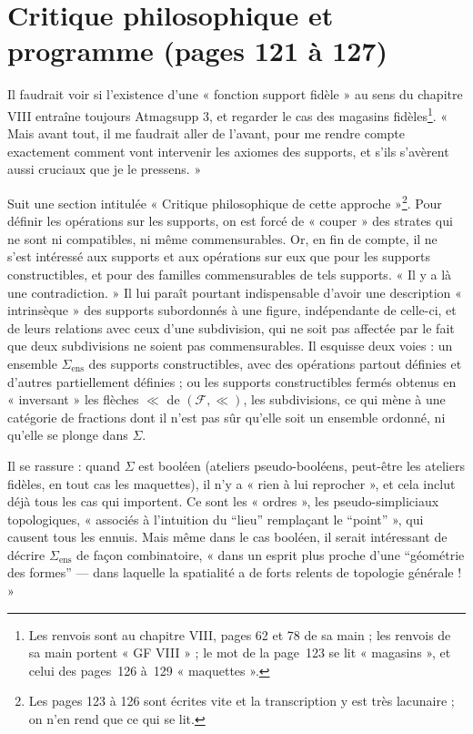 \documentclass[11pt,a4paper]{article}
\begin{document}
\section*{Critique philosophique et programme (pages 121 à 127)}

Il faudrait voir si l'existence d'une « fonction support fidèle » au sens du
chapitre VIII entraîne toujours Atmagsupp 3, et regarder le cas des magasins fidèles\footnote{Les renvois sont au chapitre VIII, pages 62 et
78 de sa main ; les renvois de sa main portent « GF VIII » ; le mot de la page~123 se lit « magasins », et celui des pages~126 à~129 « maquettes ».}. « Mais avant tout, il me
faudrait aller de l'avant, pour me rendre compte exactement comment vont
intervenir les axiomes des supports, et s'ils s'avèrent aussi cruciaux que je le
pressens. »

Suit une section intitulée « Critique philosophique de cette
approche »\footnote{Les pages 123 à 126 sont écrites vite et la transcription y
est très lacunaire ; on n'en rend que ce qui se lit.}. Pour définir les
opérations sur les supports, on est forcé de « couper » des strates qui ne sont
ni compatibles, ni même commensurables. Or, en fin de compte, il ne s'est
intéressé aux supports et aux opérations sur eux que pour les supports
constructibles, et pour des familles commensurables de tels supports. « Il y a là
une contradiction. » Il lui paraît pourtant indispensable d'avoir une description
« intrinsèque » des supports subordonnés à une figure, indépendante de celle-ci,
et de leurs relations avec ceux d'une subdivision, qui ne soit pas affectée par
le fait que deux subdivisions ne soient pas commensurables. Il esquisse deux
voies : un ensemble $\Sigma_{\mathrm{ens}}$ des supports constructibles, avec des
opérations partout définies et d'autres partiellement définies ; ou les supports
constructibles fermés obtenus en « inversant » les flèches $\ll$ de
$(\mathcal{F}, \ll)$, les subdivisions, ce qui mène à une catégorie de fractions dont il
n'est pas sûr qu'elle soit un ensemble ordonné, ni qu'elle se plonge dans
$\Sigma$.

Il se rassure : quand $\Sigma$ est booléen (ateliers pseudo-booléens, peut-être
les ateliers fidèles, en tout cas les maquettes), il n'y a « rien à lui reprocher », et cela inclut déjà tous les cas qui importent. Ce sont
les « ordres », les pseudo-simpliciaux topologiques, « associés à l'intuition du
“lieu” remplaçant le “point” », qui causent tous les ennuis. Mais même dans le cas
booléen, il serait intéressant de décrire $\Sigma_{\mathrm{ens}}$ de façon
combinatoire, « dans un esprit plus proche d'une “géométrie des formes” --- dans
laquelle la spatialité a de forts relents de topologie générale ! »
\end{document}
